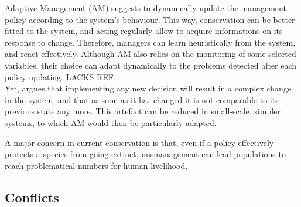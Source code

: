 \documentclass[12pt,a4paper]{article}
\begin{document}
Adaptive Management (AM) suggests to dynamically update the management policy according to the system's behaviour.
This way, conservation can be better fitted to the system, and acting regularly allow to acquire informations on its response to change.
Therefore, managers can learn heuristically from the system, and react effectively.
Although AM also relies on the monitoring of some selected variables, their choice can adapt dynamically to the problems detected after each policy updating.
LACKS REF\\
%
%
Yet, \cite{game2013conservation} argues that implementing any new decision will result in a complex change in the system, and that as soon as it has changed it is not comparable to its previous state any more.
This artefact can be reduced in small-scale, simpler systems, to which AM would then be particularly adapted.
%

A major concern in current conservation is that, even if a policy effectively protects a species from going extinct, mismanagement can lead populations to reach problematical numbers for human livelihood.

\subsection{Conflicts}
\end{document}
